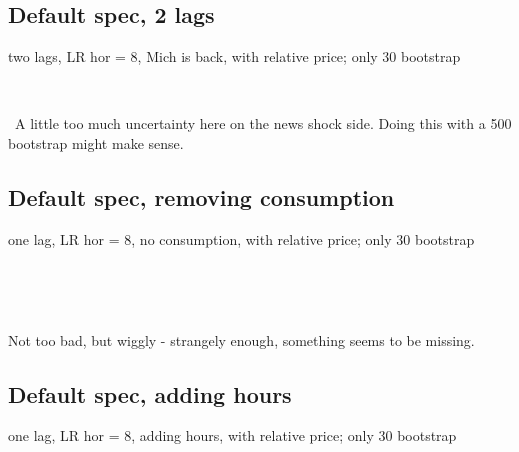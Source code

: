 \documentclass{article}
\def \ourFigPath {../}
\begin{document}
	\subsection{Default spec, 2 lags}
	\noindent two lags, LR hor = 8, Mich is back, with relative price; only 30 bootstrap
	
	\
	
	
	
	
	\begin{figure}[h!]
\centering
{} \hspace{.2in%
} 
\end{figure}

\
A little too much uncertainty here on the news shock side. Doing this with a 500 bootstrap might make sense. %



\newpage
	\subsection{Default spec, removing consumption}
	\noindent one lag, LR hor = 8, no consumption, with relative price; only 30 bootstrap
	
	\
	
	
	
	
	\begin{figure}[h!]
\centering
{} \hspace{.2in%
} 
\end{figure}

\

Not too bad, but wiggly - strangely enough, something seems to be missing.

\newpage
	\subsection{Default spec, adding hours}
	\noindent one lag, LR hor = 8, adding hours, with relative price; only 30 bootstrap
	
\end{document}
